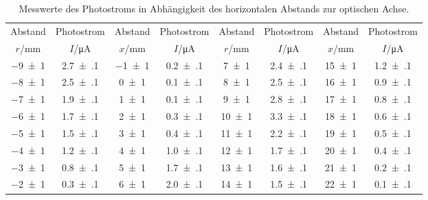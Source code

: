 \begin{table}[!h]
	\centering
	\begin{adjustbox}{width=1\textwidth}
	\begin{tabular}{cccccccc}
		\toprule
		Abstand & Photostrom & Abstand & Photostrom & Abstand & Photostrom & Abstand & Photostrom\\
		$r$/\si{mm} & $I$/\si{\micro\ampere} & $x$/\si{mm} & $I$/\si{\micro\ampere} & $r$/\si{mm} & $I$/\si{\micro\ampere} & $x$/\si{mm} & $I$/\si{\micro\ampere}\\
\midrule
		\num{-9(1)} & \num{2.7(1)} & \num{-1(1)} & \num{0.2(1)} & \num{7(1)} & \num{2.4(1)} & \num{15(1)} & \num{1.2(1)}\\
		\num{-8(1)} & \num{2.5(1)} & \num{0(1)} & \num{0.1(1)} & \num{8(1)} & \num{2.5(1)} & \num{16(1)} & \num{0.9(1)}\\
		\num{-7(1)} & \num{1.9(1)} & \num{1(1)} & \num{0.1(1)} & \num{9(1)} & \num{2.8(1)} & \num{17(1)} & \num{0.8(1)}\\
		\num{-6(1)} & \num{1.7(1)} & \num{2(1)} & \num{0.3(1)} & \num{10(1)} & \num{3.3(1)} & \num{18(1)} & \num{0.6(1)}\\
		\num{-5(1)} & \num{1.5(1)} & \num{3(1)} & \num{0.4(1)} & \num{11(1)} & \num{2.2(1)} & \num{19(1)} & \num{0.5(1)}\\
		\num{-4(1)} & \num{1.2(1)} & \num{4(1)} & \num{1.0(1)} & \num{12(1)} & \num{1.7(1)} & \num{20(1)} & \num{0.4(1)}\\
		\num{-3(1)} & \num{0.8(1)} & \num{5(1)} & \num{1.7(1)} & \num{13(1)} & \num{1.6(1)} & \num{21(1)} & \num{0.2(1)}\\
		\num{-2(1)} & \num{0.3(1)} & \num{6(1)} & \num{2.0(1)} & \num{14(1)} & \num{1.5(1)} & \num{22(1)} & \num{0.1(1)}\\
		\bottomrule
	\end{tabular}
	\end{adjustbox}
	\caption{Messwerte des Photostroms in Abhängigkeit des horizontalen Abstands zur optischen Achse. \label{tab:TEM10}}
\end{table}
